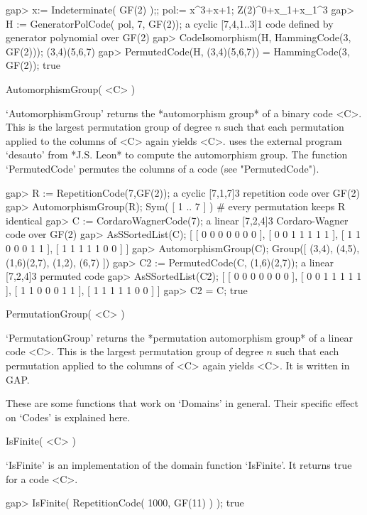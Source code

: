 \beginexample
gap> x:= Indeterminate( GF(2) );; pol:= x^3+x+1; 
Z(2)^0+x_1+x_1^3
gap> H := GeneratorPolCode( pol, 7, GF(2));          
a cyclic [7,4,1..3]1 code defined by generator polynomial over GF(2)
gap> CodeIsomorphism(H, HammingCode(3, GF(2)));
(3,4)(5,6,7) 
gap> PermutedCode(H, (3,4)(5,6,7)) = HammingCode(3, GF(2));
true 
\endexample

\>AutomorphismGroup( <C> )

`AutomorphismGroup' returns the  *automorphism group*  of a binary   code
<C>. This is the largest  permutation group of degree  $n$ such that each
permutation applied to the columns of <C> again yields <C>. {\GUAVA} uses
the   external   program `desauto'   from *J.S.   Leon*  \cite{Leon91}
to   compute the automorphism group. The function `PermutedCode' 
permutes the columns of a
code (see "PermutedCode").

\beginexample
gap> R := RepetitionCode(7,GF(2));
a cyclic [7,1,7]3 repetition code over GF(2)
gap> AutomorphismGroup(R);
Sym( [ 1 .. 7 ] )
                        # every permutation keeps R identical
gap> C := CordaroWagnerCode(7);
a linear [7,2,4]3 Cordaro-Wagner code over GF(2)
gap> AsSSortedList(C);
[ [ 0 0 0 0 0 0 0 ], [ 0 0 1 1 1 1 1 ], [ 1 1 0 0 0 1 1 ], [ 1 1 1 1 1 0 0 ] ]
gap> AutomorphismGroup(C);
Group([ (3,4), (4,5), (1,6)(2,7), (1,2), (6,7) ])
gap> C2 :=  PermutedCode(C, (1,6)(2,7));
a linear [7,2,4]3 permuted code
gap> AsSSortedList(C2);
[ [ 0 0 0 0 0 0 0 ], [ 0 0 1 1 1 1 1 ], [ 1 1 0 0 0 1 1 ], [ 1 1 1 1 1 0 0 ] ]
gap> C2 = C;
true 
\endexample

\>PermutationGroup( <C> )

`PermutationGroup' returns the  *permutation automorphism group*  
of a linear code <C>. This is the largest permutation group of 
degree  $n$ such that each
permutation applied to the columns of <C> again yields <C>.
It is written in GAP.


These are some {\GAP} functions that work on  `Domains' in general. Their
specific effect on `Codes' is explained here.

\>IsFinite( <C> )

`IsFinite'  is an    implementation  of   the   {\GAP} domain    function
`IsFinite'. It returns true for a code <C>.

\beginexample
gap> IsFinite( RepetitionCode( 1000, GF(11) ) );
true 
\endexample

